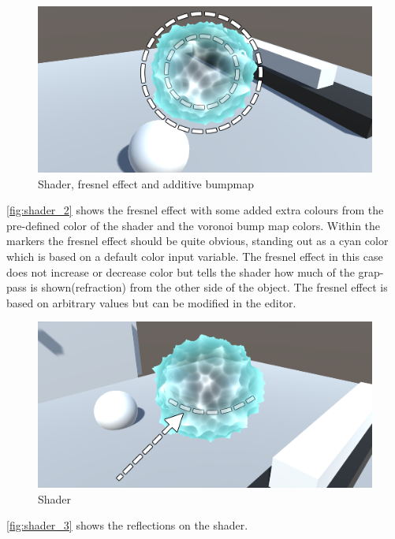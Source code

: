 \documentclass{article}
\begin{document}
\begin{figure}[H]
    \centering
    \includegraphics[width=\textwidth]{img/shader_2}
    \caption{Shader, fresnel effect and additive bumpmap}
    \label{fig:shader_2}
\end{figure}
\autoref{fig:shader_2} shows the fresnel effect with some added extra colours from the pre-defined color of the shader and the voronoi bump map colors. Within the markers the fresnel effect should be quite obvious, standing out as a cyan color which is based on a default color input variable. The fresnel effect in this case does not increase or decrease color but tells the shader how much of the grap-pass is shown(refraction) from the other side of the object. The fresnel effect is based on arbitrary values but can be modified in the editor. %

\begin{figure}[H]
    \centering
    \includegraphics[width=\textwidth]{img/shader_3}
    \caption{Shader}
    \label{fig:shader_3}
\end{figure}
\autoref{fig:shader_3} shows the reflections on the shader.\\
\end{document}
